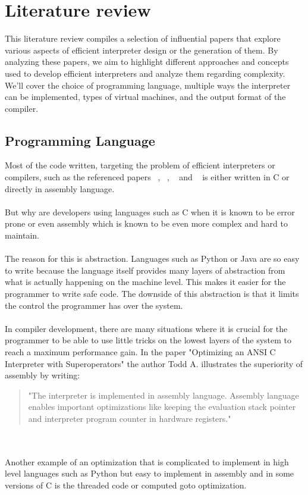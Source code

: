 \documentclass{article}
\begin{document}
\section{Literature review}
This literature review compiles a selection of influential papers that explore
various aspects of efficient interpreter design or the generation of them. By
analyzing these papers, we aim to highlight different approaches and concepts
used to develop efficient interpreters and analyze them regarding complexity.
We'll cover the choice of programming language, multiple ways the interpreter
can be implemented, types of virtual machines, and the output format of the
compiler.

\subsection{Programming Language}
Most of the code written, targeting the problem of efficient interpreters or
compilers, such as the referenced papers ~\cite{vmgen}, ~\cite{modern},
~\cite{superoperators} and ~\cite{stack_caching_for_interpreters} is either
written in C or directly in assembly language. 
\\\\
But why are developers using languages such as C when it is known to be error
prone or even assembly which is known to be even more complex and hard to
maintain.
\\\\
The reason for this is abstraction. Languages such as Python or Java are so
easy to write because the language itself provides many layers of abstraction
from what is actually happening on the machine level. This makes it easier for
the programmer to write safe code. The downside of this abstraction is that it
limits the control the programmer has over the system. ~\cite{abstraction}
\\\\
In compiler development, there are many situations where it is crucial for the
programmer to be able to use little tricks on the lowest layers of the system
to reach a maximum performance gain. In the paper "Optimizing an ANSI C
Interpreter with Superoperators" the author Todd A. illustrates the superiority
of assembly by writing:

\begin{quotation}
"The interpreter is implemented in assembly language.
Assembly language enables important optimizations like keeping the evaluation
stack pointer and interpreter program counter in hardware registers." ~\cite{superoperators}
\end{quotation}
\\\\
Another example of an optimization that is complicated to implement in high
level languages such as Python but easy to implement in assembly and in some
versions of C is the threaded code or computed goto optimization.
\end{document}
